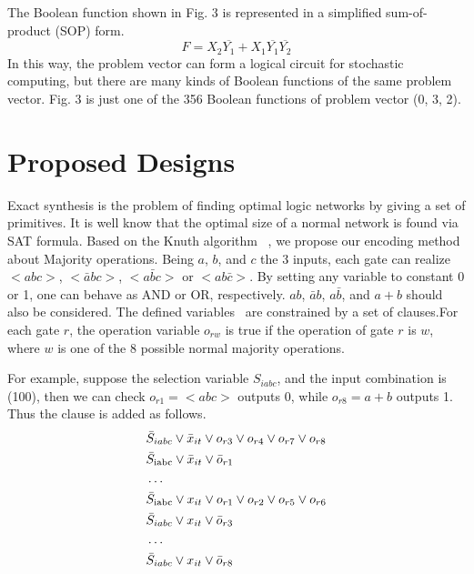 \documentclass[conference,letterpaper]{IEEEtran}
\begin{document}
The Boolean function shown in Fig. 3 is represented in a simplified sum-of-product (SOP) form.
\begin{equation}
F=X_{2} \overline{Y_{1}}+X_{1} \overline{Y_{1}}     \overline{Y_{2}}
\end{equation}
In this way, the problem vector can form a logical circuit for stochastic computing, but there are many kinds of Boolean functions of the same problem vector. Fig. 3 is just one of the 356 Boolean functions of problem vector (0, 3, 2).


\section*{Proposed Designs}
Exact synthesis is the problem of finding optimal logic networks by giving a set of primitives. It is well know that the optimal size of a normal network is found via SAT formula\cite{3}. Based on the Knuth algorithm ~\cite{4}, we propose our encoding method about Majority operations. Being $a$, $b$, and $c$ the 3 inputs, each gate can realize $<a b c>$, $<\bar{a} b c>$, $<a \bar{b} c>$ or $<a b \bar{c}>$. By setting any variable to constant 0 or 1, one can behave as AND or OR, respectively. $a b$, $\bar{a} b$, $a \bar{b}$, and $a+b$ should also be considered. The defined variables~\cite{5} are constrained by a set of clauses.For each gate $r$, the operation variable  $o_{r w}$ is true if the operation of gate $r$ is $w$, where $w$ is one of the 8 possible normal majority operations.

For example, suppose the selection variable $S_{i a b c}$, and the input combination is (100), then we can check $o_{r 1}=<abc>$ outputs 0, while $o_{r 8}=a+b$ outputs 1. Thus the clause is added as follows.
\begin{equation}                     %
\begin{split}
&\bar{S}_{i a b c} \vee \bar{x}_{i t} \vee o_{r 3} \vee o_{r 4} \vee o_{r 7} \vee o_{r 8} \\
&\bar{S}_{\text {iabc}} \vee \bar{x}_{i t} \vee \bar{o}_{r 1} \\
\centering &\ldots \\
&\bar{S}_{\text {iabc}} \vee x_{i t} \vee {o}_{r 1} \vee{o}_{r 2} \vee{o}_{r 5} \vee{o}_{r 6}\\
&\bar{S}_{i a b c} \vee x_{i t} \vee \bar{o}_{r 3}\\
\centering &\ldots \\
&\bar{S}_{i a b c} \vee x_{i t} \vee \bar{o}_{r 8}\\
\end{split}
\end{equation}
\end{document}
